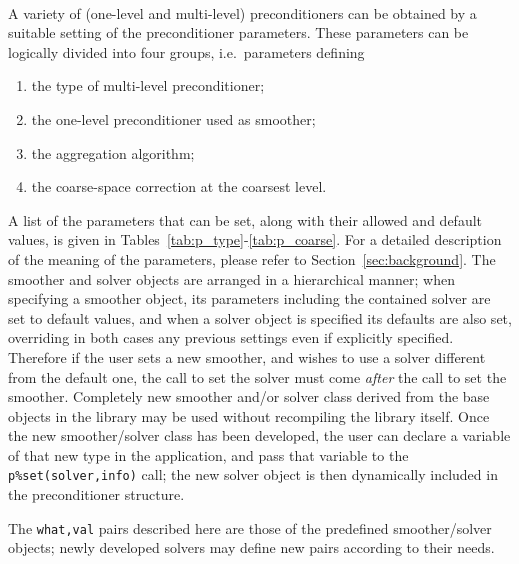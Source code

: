 \ \\
A variety of (one-level and multi-level) preconditioners can be obtained
by a suitable setting of the preconditioner parameters. These parameters
can be logically divided into four groups, i.e.\ parameters defining
\begin{enumerate}
	\item the type of multi-level preconditioner;
	\item the one-level preconditioner used as smoother;
	\item the aggregation algorithm;
	\item the coarse-space correction at the coarsest level.
\end{enumerate}
A list of the parameters that can be set, along with their allowed and
default values, is given in Tables~\ref{tab:p_type}-\ref{tab:p_coarse}.
For a detailed description  of the meaning of the parameters, please
refer to Section~\ref{sec:background}. 
%
The smoother and solver objects are arranged in a hierarchical manner;
when specifying a smoother object, its parameters including the
contained solver are set to  default values, and when a solver
object is specified its defaults are also set, overriding in both
cases any previous settings even if explicitly specified. Therefore if
the user sets a new smoother, and wishes to use a solver
different from  the default one, the call to set the solver must come
\emph{after} the call to set the smoother. 
%
 Completely new smoother and/or  solver class derived from the
base objects in the library may be used without recompiling the
library itself. Once the new smoother/solver  class has been
developed, the user can declare a variable of that new type in the
application, and pass that variable to the \verb|p%set(solver,info)|
call; the new solver object is then dynamically included in the
preconditioner structure. 

The \verb|what,val| pairs described here are those of the predefined
smoother/solver objects; newly developed solvers may define new pairs
according to their needs. 


